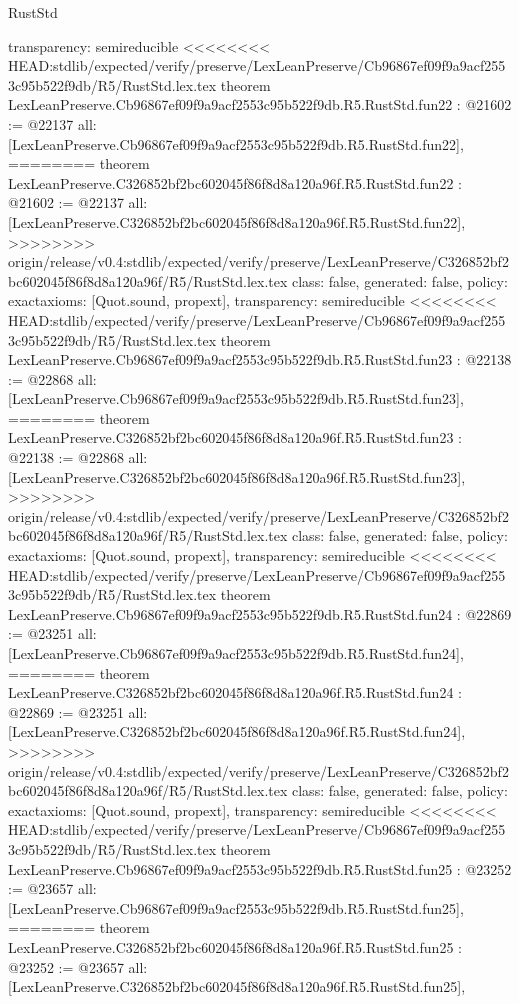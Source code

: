 \begin{lexlean}{RustStd}
\begin{coremodule}
{\begin{coremodule}
{{{{{{{{{{{{{{{{{{{{{{{{{  transparency: semireducible
}
<<<<<<<< HEAD:stdlib/expected/verify/preserve/LexLeanPreserve/Cb96867ef09f9a9acf2553c95b522f9db/R5/RustStd.lex.tex
theorem LexLeanPreserve.Cb96867ef09f9a9acf2553c95b522f9db.R5.RustStd.fun22 : @21602 := @22137 {
  all: [LexLeanPreserve.Cb96867ef09f9a9acf2553c95b522f9db.R5.RustStd.fun22],
========
theorem LexLeanPreserve.C326852bf2bc602045f86f8d8a120a96f.R5.RustStd.fun22 : @21602 := @22137 {
  all: [LexLeanPreserve.C326852bf2bc602045f86f8d8a120a96f.R5.RustStd.fun22],
>>>>>>>> origin/release/v0.4:stdlib/expected/verify/preserve/LexLeanPreserve/C326852bf2bc602045f86f8d8a120a96f/R5/RustStd.lex.tex
  class: false,
  generated: false,
  policy: exact{axioms: [Quot.sound, propext]},
  transparency: semireducible
}
<<<<<<<< HEAD:stdlib/expected/verify/preserve/LexLeanPreserve/Cb96867ef09f9a9acf2553c95b522f9db/R5/RustStd.lex.tex
theorem LexLeanPreserve.Cb96867ef09f9a9acf2553c95b522f9db.R5.RustStd.fun23 : @22138 := @22868 {
  all: [LexLeanPreserve.Cb96867ef09f9a9acf2553c95b522f9db.R5.RustStd.fun23],
========
theorem LexLeanPreserve.C326852bf2bc602045f86f8d8a120a96f.R5.RustStd.fun23 : @22138 := @22868 {
  all: [LexLeanPreserve.C326852bf2bc602045f86f8d8a120a96f.R5.RustStd.fun23],
>>>>>>>> origin/release/v0.4:stdlib/expected/verify/preserve/LexLeanPreserve/C326852bf2bc602045f86f8d8a120a96f/R5/RustStd.lex.tex
  class: false,
  generated: false,
  policy: exact{axioms: [Quot.sound, propext]},
  transparency: semireducible
}
<<<<<<<< HEAD:stdlib/expected/verify/preserve/LexLeanPreserve/Cb96867ef09f9a9acf2553c95b522f9db/R5/RustStd.lex.tex
theorem LexLeanPreserve.Cb96867ef09f9a9acf2553c95b522f9db.R5.RustStd.fun24 : @22869 := @23251 {
  all: [LexLeanPreserve.Cb96867ef09f9a9acf2553c95b522f9db.R5.RustStd.fun24],
========
theorem LexLeanPreserve.C326852bf2bc602045f86f8d8a120a96f.R5.RustStd.fun24 : @22869 := @23251 {
  all: [LexLeanPreserve.C326852bf2bc602045f86f8d8a120a96f.R5.RustStd.fun24],
>>>>>>>> origin/release/v0.4:stdlib/expected/verify/preserve/LexLeanPreserve/C326852bf2bc602045f86f8d8a120a96f/R5/RustStd.lex.tex
  class: false,
  generated: false,
  policy: exact{axioms: [Quot.sound, propext]},
  transparency: semireducible
}
<<<<<<<< HEAD:stdlib/expected/verify/preserve/LexLeanPreserve/Cb96867ef09f9a9acf2553c95b522f9db/R5/RustStd.lex.tex
theorem LexLeanPreserve.Cb96867ef09f9a9acf2553c95b522f9db.R5.RustStd.fun25 : @23252 := @23657 {
  all: [LexLeanPreserve.Cb96867ef09f9a9acf2553c95b522f9db.R5.RustStd.fun25],
========
theorem LexLeanPreserve.C326852bf2bc602045f86f8d8a120a96f.R5.RustStd.fun25 : @23252 := @23657 {
  all: [LexLeanPreserve.C326852bf2bc602045f86f8d8a120a96f.R5.RustStd.fun25],
}}}}}}}}}}}}}}}}}}}}}}}}}}}}}
\end{coremodule}}
\end{coremodule}
\end{lexlean}
